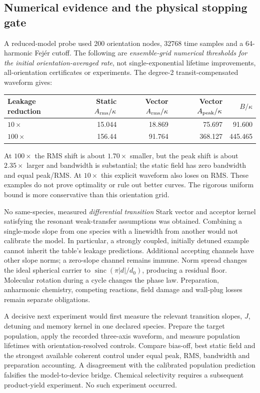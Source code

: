 \documentclass[11pt]{article}
\newcommand{\sinc}{\operatorname{sinc}}
\begin{document}
\subsection{Numerical evidence and the physical stopping gate}

A reduced-model probe used 200 orientation nodes, 32768 time samples and a
64-harmonic Fej\'er cutoff. The following are \emph{ensemble-grid numerical thresholds for the initial
orientation-averaged rate}, not single-exponential lifetime improvements,
all-orientation certificates or experiments. The degree-2
transit-compensated waveform gives:
\begin{center}\small
\begin{tabular}{lrrrr}
\toprule
Leakage reduction & Static $A_{\rm rms}/\kappa$ & Vector $A_{\rm rms}/\kappa$ & Vector $A_{\rm peak}/\kappa$ & $B/\kappa$\\
\midrule
$10\times$ &15.044&18.869&75.697&91.600\\
$100\times$&156.44&91.764&368.127&445.465\\
\bottomrule
\end{tabular}
\end{center}
At $100\times$ the RMS shift is about $1.70\times$ smaller, but the peak shift
is about $2.35\times$ larger and bandwidth is substantial; the static field has
zero bandwidth and equal peak/RMS. At $10\times$ this explicit waveform also
loses on RMS. These examples do not prove optimality or rule out better curves.
The rigorous uniform bound is more conservative than this orientation grid.

No same-species, measured \emph{differential transition} Stark vector and
acceptor kernel satisfying the resonant weak-transfer assumptions was obtained.
Combining a single-mode slope from one species with a linewidth from another
would not calibrate the model. In particular, a strongly coupled, initially
detuned example cannot inherit the table's leakage predictions.
Additional accepting channels have other slope norms; a zero-slope channel
remains immune. Norm spread changes the ideal spherical carrier to
$\sinc(\pi |d|/d_0)$, producing a residual floor. Molecular rotation during a
cycle changes the phase law. Preparation, anharmonic chemistry, competing
reactions, field damage and wall-plug losses remain separate obligations.

A decisive next experiment would first measure the relevant transition slopes,
$J$, detuning and memory kernel in one declared species. Prepare the target
population, apply the recorded three-axis waveform, and measure population
lifetimes with orientation-resolved controls. Compare bias-off, best static
field and the strongest available coherent control under equal peak, RMS,
bandwidth and preparation accounting. A disagreement with the calibrated
population prediction falsifies the model-to-device bridge. Chemical selectivity
requires a subsequent product-yield experiment. No such experiment occurred.
\end{document}
